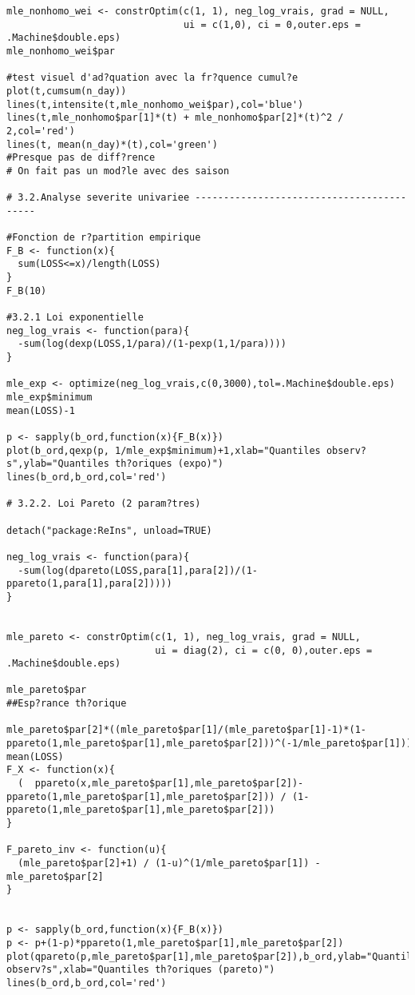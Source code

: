 \begin{verbatim}
mle_nonhomo_wei <- constrOptim(c(1, 1), neg_log_vrais, grad = NULL, 
                               ui = c(1,0), ci = 0,outer.eps = .Machine$double.eps)
mle_nonhomo_wei$par

#test visuel d'ad?quation avec la fr?quence cumul?e
plot(t,cumsum(n_day))
lines(t,intensite(t,mle_nonhomo_wei$par),col='blue')
lines(t,mle_nonhomo$par[1]*(t) + mle_nonhomo$par[2]*(t)^2 / 2,col='red')
lines(t, mean(n_day)*(t),col='green')
#Presque pas de diff?rence
# On fait pas un mod?le avec des saison

# 3.2.Analyse severite univariee ------------------------------------------

#Fonction de r?partition empirique
F_B <- function(x){
  sum(LOSS<=x)/length(LOSS)
}
F_B(10)

#3.2.1 Loi exponentielle
neg_log_vrais <- function(para){
  -sum(log(dexp(LOSS,1/para)/(1-pexp(1,1/para))))
}

mle_exp <- optimize(neg_log_vrais,c(0,3000),tol=.Machine$double.eps)
mle_exp$minimum
mean(LOSS)-1

p <- sapply(b_ord,function(x){F_B(x)})
plot(b_ord,qexp(p, 1/mle_exp$minimum)+1,xlab="Quantiles observ?s",ylab="Quantiles th?oriques (expo)")
lines(b_ord,b_ord,col='red')

# 3.2.2. Loi Pareto (2 param?tres)

detach("package:ReIns", unload=TRUE)

neg_log_vrais <- function(para){
  -sum(log(dpareto(LOSS,para[1],para[2])/(1-ppareto(1,para[1],para[2]))))
}


mle_pareto <- constrOptim(c(1, 1), neg_log_vrais, grad = NULL, 
                          ui = diag(2), ci = c(0, 0),outer.eps = .Machine$double.eps)

mle_pareto$par
##Esp?rance th?orique

mle_pareto$par[2]*((mle_pareto$par[1]/(mle_pareto$par[1]-1)*(1-ppareto(1,mle_pareto$par[1],mle_pareto$par[2]))^(-1/mle_pareto$par[1]))-1)
mean(LOSS)
F_X <- function(x){
  (  ppareto(x,mle_pareto$par[1],mle_pareto$par[2])-ppareto(1,mle_pareto$par[1],mle_pareto$par[2])) / (1-ppareto(1,mle_pareto$par[1],mle_pareto$par[2]))
}

F_pareto_inv <- function(u){
  (mle_pareto$par[2]+1) / (1-u)^(1/mle_pareto$par[1]) - mle_pareto$par[2]
}


p <- sapply(b_ord,function(x){F_B(x)})
p <- p+(1-p)*ppareto(1,mle_pareto$par[1],mle_pareto$par[2])
plot(qpareto(p,mle_pareto$par[1],mle_pareto$par[2]),b_ord,ylab="Quantiles observ?s",xlab="Quantiles th?oriques (pareto)")
lines(b_ord,b_ord,col='red')



\end{verbatim}
